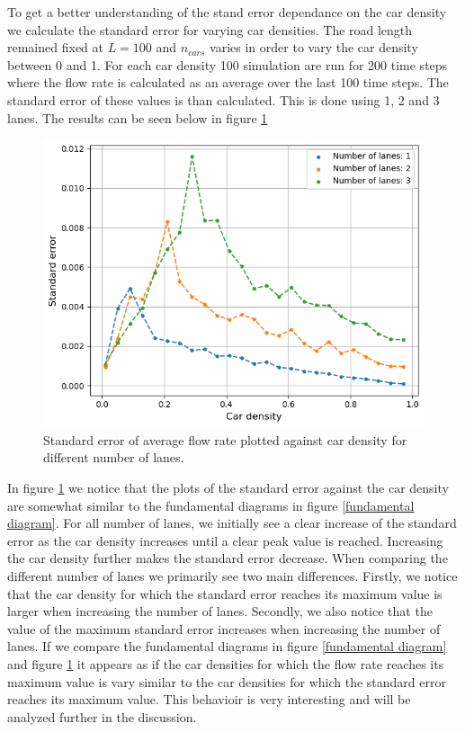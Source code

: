\documentclass[a4paper,12pt]{article}
\begin{document}
To get a better understanding of the stand error dependance on the car density we calculate the standard error for varying car densities.
The road length remained fixed at $L=100$ and $n_{cars}$ varies in order to vary the car density between 0 and 1. For each car density 100 simulation are run
for 200 time steps where the flow rate is calculated as an average over the last 100 time steps. The standard error of these values is than calculated.
This is done using 1, 2 and 3 lanes. The results can be seen below in figure \ref*{standard error}

\begin{figure}[H]
    \centering
    \includegraphics[scale=0.9]{Images/standard deviation.png}
    \caption{Standard error of average flow rate plotted against car density for different number of lanes.}
    \label{standard error}
\end{figure}

In figure \ref*{standard error} we notice that the plots of the standard error against the car density are somewhat similar to the fundamental diagrams
in figure \ref*{fundamental diagram}. For all number of lanes, we initially see a clear increase of the standard error as the car density increases
until a clear peak value is reached. Increasing the car density further makes the standard error decrease. When comparing the different number of lanes we primarily
see two main differences. Firstly, we notice that the car density for which the standard error reaches its maximum value is larger when increasing the number of lanes.
Secondly, we also notice that the value of the maximum standard error increases when increasing the number of lanes. If we compare the fundamental
diagrams in figure \ref*{fundamental diagram} and figure \ref*{standard error} it appears as if the car densities for which the flow rate reaches its maximum
value is vary similar to the car densities for which the standard error reaches its maximum value. This behavioir is very interesting and will be analyzed further
in the discussion.
\end{document}
